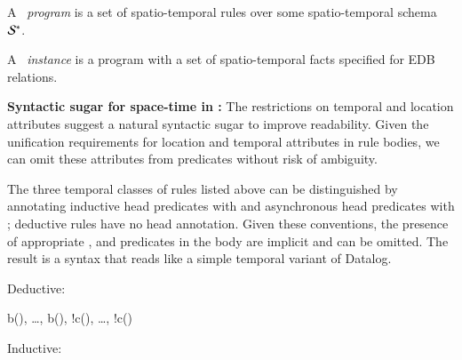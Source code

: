 A \lang\ {\em program} is a set of spatio-temporal rules over some spatio-temporal schema $\stschema$.  


A \lang\ {\em instance} is a program with a set of spatio-temporal facts specified for EDB relations. 

\noindent
\textbf{Syntactic sugar for space-time in \lang:}
The restrictions on temporal and location attributes suggest a natural syntactic sugar to improve readability.  Given the unification requirements for location and temporal attributes in rule bodies, we can omit these attributes from predicates without risk of ambiguity.  

The three temporal classes of rules listed above can be distinguished by
annotating inductive head predicates with  and asynchronous head
predicates with ; deductive rules have no head annotation. 
Given these conventions, the presence of appropriate ,
 and  predicates in the body are implicit and can
be omitted.  The result is a syntax that reads like a simple temporal variant of
Datalog. 

Deductive:

\begin{Drules}
        {b(), \ldots, b(), !c(), \ldots, !c()}
\end{Drules}

Inductive:

